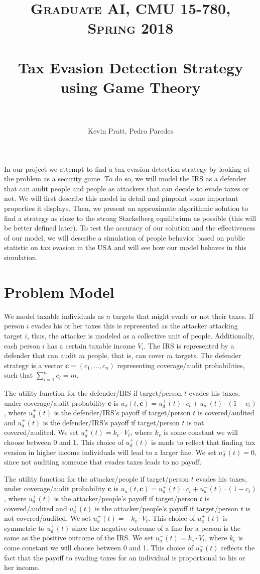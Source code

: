 \documentclass[paper=letter, fontsize=11pt]{article}
\title{
  \normalfont \normalsize
  \textsc{Graduate AI, CMU 15-780, Spring 2018} \\ [25pt]
  \horrule{0.5pt} \\[0.4cm]
  \huge Tax Evasion Detection Strategy using Game Theory \\
  \horrule{2pt} \\[0.5cm]
}
\author{Kevin Pratt, Pedro Paredes}
\date{}
\begin{document}
\maketitle
\thispagestyle{firstpage}

In our project we attempt to find a tax evasion detection strategy by
looking at the problem as a security game. To do so, we will model the
IRS as a defender that can audit people and people as attackers that
can decide to evade taxes or not. We will first describe this model in
detail and pinpoint some important properties it displays. Then, we
present an approximate algorithmic solution to find a strategy as
close to the strong Stackelberg equilibrium as possible (this will be
better defined later). To test the accuracy of our solution and the
effectiveness of our model, we will describe a simulation of people
behavior based on public statistic on tax evasion in the USA and will
see how our model behaves in this simulation.

\section*{Problem Model}

We model taxable individuals as $n$ targets that might evade or not
their taxes. If person $i$ evades his or her taxes this is represented
as the attacker attacking target $i$, thus, the attacker is modeled as
a collective unit of people. Additionally, each person $i$ has a
certain taxable income $V_i$. The IRS is represented by a defender
that can audit $m$ people, that is, can cover $m$ targets. The
defender strategy is a vector $\bm{c} = (c_1, \ldots, c_n)$
representing coverage/audit probabilities, such that
$\sum_{i = 1}^n c_i = m$.

The utility function for the defender/IRS if target/person $t$ evades
his taxes, under coverage/audit probability $\bm{c}$ is
$u_d(t, \bm{c}) = u_d^+(t) \cdot c_t + u_d^-(t) \cdot (1 - c_t)$,
where $u_d^+(t)$ is the defender/IRS's payoff if target/person $t$ is
covered/audited and $u_d^+(t)$ is the defender/IRS's payoff if
target/person $t$ is not covered/audited. We set
$u_d^+(t) = k_v \cdot V_t$, where $k_v$ is some constant we will
choose between 0 and 1. This choice of $u_d^+(t)$ is made to reflect
that finding tax evasion in higher income individuals will lead to a
larger fine. We set $u_d^-(t) = 0$, since not auditing someone that
evades taxes leads to no payoff.

The utility function for the attacker/people if target/person $t$
evades his taxes, under coverage/audit probability $\bm{c}$ is
$u_a(t, \bm{c}) = u_a^+(t) \cdot c_t + u_a^-(t) \cdot (1 - c_t)$,
where $u_a^+(t)$ is the attacker/people's payoff if target/person $t$
is covered/audited and $u_a^+(t)$ is the attacker/people's payoff if
target/person $t$ is not covered/audited. We set
$u_a^+(t) = -k_v \cdot V_t$. This choice of $u_a^+(t)$ is symmetric to
$u_d^+(t)$ since the negative outcome of a fine for a person is the
same as the positive outcome of the IRS. We set
$u_a^-(t) = k_e \cdot V_t$, where $k_e$ is come constant we will
choose between 0 and 1. This choice of $u_a^-(t)$ reflects the fact
that the payoff to evading taxes for an individual is proportional to
his or her income.
\end{document}
